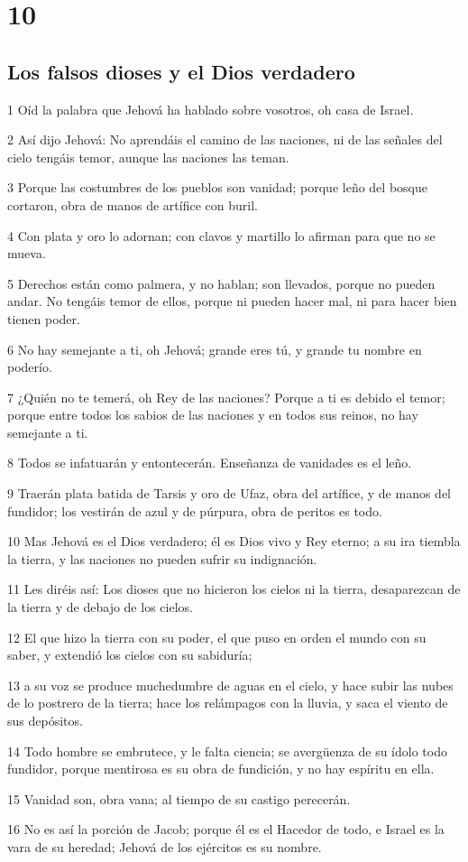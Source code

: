 \chapter{10}

\section*{Los falsos dioses y el Dios verdadero}

\par 1 Oíd la palabra que Jehová ha hablado sobre vosotros, oh casa de Israel.
\par 2 Así dijo Jehová: No aprendáis el camino de las naciones, ni de las señales del cielo tengáis temor, aunque las naciones las teman.
\par 3 Porque las costumbres de los pueblos son vanidad; porque leño del bosque cortaron, obra de manos de artífice con buril.
\par 4 Con plata y oro lo adornan; con clavos y martillo lo afirman para que no se mueva.
\par 5 Derechos están como palmera, y no hablan; son llevados, porque no pueden andar. No tengáis temor de ellos, porque ni pueden hacer mal, ni para hacer bien tienen poder.
\par 6 No hay semejante a ti, oh Jehová; grande eres tú, y grande tu nombre en poderío.
\par 7 ¿Quién no te temerá, oh Rey de las naciones? Porque a ti es debido el temor; porque entre todos los sabios de las naciones y en todos sus reinos, no hay semejante a ti.
\par 8 Todos se infatuarán y entontecerán. Enseñanza de vanidades es el leño.
\par 9 Traerán plata batida de Tarsis y oro de Ufaz, obra del artífice, y de manos del fundidor; los vestirán de azul y de púrpura, obra de peritos es todo.
\par 10 Mas Jehová es el Dios verdadero; él es Dios vivo y Rey eterno; a su ira tiembla la tierra, y las naciones no pueden sufrir su indignación.
\par 11 Les diréis así: Los dioses que no hicieron los cielos ni la tierra, desaparezcan de la tierra y de debajo de los cielos.
\par 12 El que hizo la tierra con su poder, el que puso en orden el mundo con su saber, y extendió los cielos con su sabiduría;
\par 13 a su voz se produce muchedumbre de aguas en el cielo, y hace subir las nubes de lo postrero de la tierra; hace los relámpagos con la lluvia, y saca el viento de sus depósitos.
\par 14 Todo hombre se embrutece, y le falta ciencia; se avergüenza de su ídolo todo fundidor, porque mentirosa es su obra de fundición, y no hay espíritu en ella.
\par 15 Vanidad son, obra vana; al tiempo de su castigo perecerán.
\par 16 No es así la porción de Jacob; porque él es el Hacedor de todo, e Israel es la vara de su heredad; Jehová de los ejércitos es su nombre.

